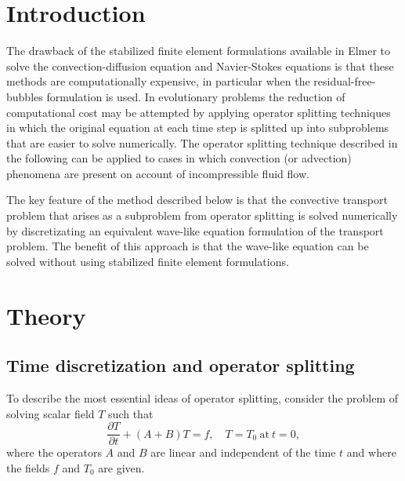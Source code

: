 \noindent
{}
\begin{versiona}

\section{Introduction}

The drawback of the stabilized finite element formulations available
in Elmer to solve the convection-diffusion equation and Navier-Stokes 
equations is that these methods are computationally expensive, in particular
when the residual-free-bubbles formulation is used.
In evolutionary problems the reduction of computational cost may be attempted 
by applying operator splitting techniques in which the original equation at 
each time step is splitted up into subproblems that are 
easier to solve numerically. The operator splitting technique described in 
the following can be applied to cases in which convection (or advection) 
phenomena are present on account of incompressible fluid flow. 

The key feature of the method described below is that the convective transport 
problem that arises as a subproblem from operator splitting is solved 
numerically by discretizating an equivalent wave-like equation formulation of 
the transport problem. The benefit of this approach is that the wave-like 
equation can be solved without using stabilized finite element formulations.

\section{Theory}

\subsection{Time discretization and operator splitting}

To describe the most essential ideas of operator splitting, consider the 
problem of solving scalar field $T$ such that
\begin{equation}\label{modeleq}
\frac{\partial T}{\partial t}+(A+B)T=f, \quad T=T_0 \ \mathrm{at}\ t=0,
\end{equation} 
where the operators $A$ and $B$ are linear and independent of the time $t$ and 
where the fields $f$ and $T_0$ are given. 


\end{versiona}
